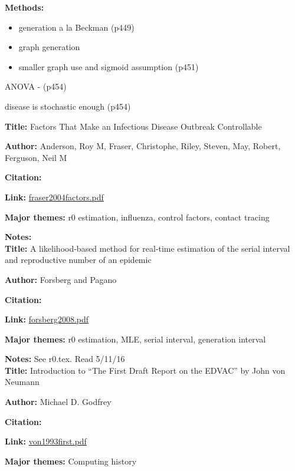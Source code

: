 \message{ !name(refs.tex)}\documentclass{article}
\begin{document}
\textbf{Methods:}
\begin{itemize}
\item generation a la Beckman (p449)
\item graph generation
\item smaller graph use and sigmoid assumption (p451)
\end{itemize}

ANOVA - (p454)

disease is stochastic enough (p454)

\textbf{Title:}  Factors That Make an Infectious Disease Outbreak Controllable 

\textbf{Author:}  Anderson, Roy M, Fraser, Christophe, Riley, Steven, May, Robert, Ferguson, Neil M

\textbf{Citation:}\cite{fraser2004factors}

\textbf{Link:} \url{fraser2004factors.pdf}

\textbf{Major themes:}  r0 estimation, influenza, control factors, contact tracing

\textbf{Notes:}
\\


\textbf{Title:}  A likelihood‐based method for real‐time estimation of the serial interval and reproductive number of an epidemic 

\textbf{Author:}  Forsberg and Pagano

\textbf{Citation:}\cite{forsberg2008}

\textbf{Link:} \url{forsberg2008.pdf}

\textbf{Major themes:}  r0 estimation, MLE, serial interval, generation interval

\textbf{Notes:} See r0.tex.  Read 5/11/16
\\



\textbf{Title:}  Introduction to ``The First Draft Report on the EDVAC'' by John von Neumann 

\textbf{Author:}  Michael D. Godfrey

\textbf{Citation:}\cite{von1993first}

\textbf{Link:} \url{von1993first.pdf}

\textbf{Major themes:}  Computing history
\end{document}
